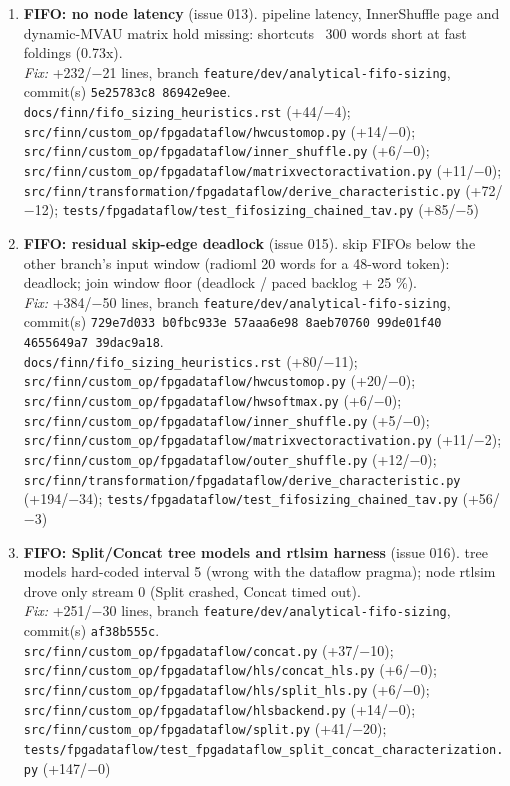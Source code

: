 \documentclass[a4paper,10pt]{article}
\begin{document}
\begin{enumerate}
\item \textbf{FIFO: no node latency} (issue 013). pipeline latency, InnerShuffle page and dynamic-MVAU matrix hold missing: shortcuts ~300 words short at fast foldings (0.73x).\\
\emph{Fix:} +232/$-$21 lines, branch \texttt{feature/dev/analytical-fifo-sizing}, commit(s) \texttt{5e25783c8 86942e9ee}.\\
{\footnotesize \texttt{docs/finn/fifo\_sizing\_heuristics.rst} (+44/$-$4); \texttt{src/finn/custom\_op/fpgadataflow/hwcustomop.py} (+14/$-$0); \texttt{src/finn/custom\_op/fpgadataflow/inner\_shuffle.py} (+6/$-$0); \texttt{src/finn/custom\_op/fpgadataflow/matrixvectoractivation.py} (+11/$-$0); \texttt{src/finn/transformation/fpgadataflow/derive\_characteristic.py} (+72/$-$12); \texttt{tests/fpgadataflow/test\_fifosizing\_chained\_tav.py} (+85/$-$5)}
\item \textbf{FIFO: residual skip-edge deadlock} (issue 015). skip FIFOs below the other branch's input window (radioml 20 words for a 48-word token): deadlock; join window floor (deadlock / paced backlog + 25 \%).\\
\emph{Fix:} +384/$-$50 lines, branch \texttt{feature/dev/analytical-fifo-sizing}, commit(s) \texttt{729e7d033 b0fbc933e 57aaa6e98 8aeb70760 99de01f40 4655649a7 39dac9a18}.\\
{\footnotesize \texttt{docs/finn/fifo\_sizing\_heuristics.rst} (+80/$-$11); \texttt{src/finn/custom\_op/fpgadataflow/hwcustomop.py} (+20/$-$0); \texttt{src/finn/custom\_op/fpgadataflow/hwsoftmax.py} (+6/$-$0); \texttt{src/finn/custom\_op/fpgadataflow/inner\_shuffle.py} (+5/$-$0); \texttt{src/finn/custom\_op/fpgadataflow/matrixvectoractivation.py} (+11/$-$2); \texttt{src/finn/custom\_op/fpgadataflow/outer\_shuffle.py} (+12/$-$0); \texttt{src/finn/transformation/fpgadataflow/derive\_characteristic.py} (+194/$-$34); \texttt{tests/fpgadataflow/test\_fifosizing\_chained\_tav.py} (+56/$-$3)}
\item \textbf{FIFO: Split/Concat tree models and rtlsim harness} (issue 016). tree models hard-coded interval 5 (wrong with the dataflow pragma); node rtlsim drove only stream 0 (Split crashed, Concat timed out).\\
\emph{Fix:} +251/$-$30 lines, branch \texttt{feature/dev/analytical-fifo-sizing}, commit(s) \texttt{af38b555c}.\\
{\footnotesize \texttt{src/finn/custom\_op/fpgadataflow/concat.py} (+37/$-$10); \texttt{src/finn/custom\_op/fpgadataflow/hls/concat\_hls.py} (+6/$-$0); \texttt{src/finn/custom\_op/fpgadataflow/hls/split\_hls.py} (+6/$-$0); \texttt{src/finn/custom\_op/fpgadataflow/hlsbackend.py} (+14/$-$0); \texttt{src/finn/custom\_op/fpgadataflow/split.py} (+41/$-$20); \texttt{tests/fpgadataflow/test\_fpgadataflow\_split\_concat\_characterization.py} (+147/$-$0)}

\end{enumerate}
\end{document}
